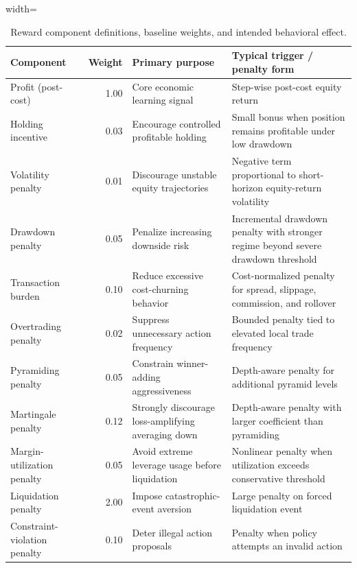 \begin{table}[!tbp]
\centering
\caption{Reward component definitions, baseline weights, and intended behavioral effect.}
\label{tab:reward_components}

\begin{adjustbox}{width=\linewidth}
\begin{tabular}{l r p{4.2cm} p{6.2cm}}
\toprule
\textbf{Component} & \textbf{Weight} & \textbf{Primary purpose} & \textbf{Typical trigger / penalty form} \\
\midrule
Profit (post-cost) & 1.00 & Core economic learning signal & Step-wise post-cost equity return \\
Holding incentive & 0.03 & Encourage controlled profitable holding & Small bonus when position remains profitable under low drawdown \\
Volatility penalty & 0.01 & Discourage unstable equity trajectories & Negative term proportional to short-horizon equity-return volatility \\
Drawdown penalty & 0.05 & Penalize increasing downside risk & Incremental drawdown penalty with stronger regime beyond severe drawdown threshold \\
Transaction burden & 0.10 & Reduce excessive cost-churning behavior & Cost-normalized penalty for spread, slippage, commission, and rollover \\
Overtrading penalty & 0.02 & Suppress unnecessary action frequency & Bounded penalty tied to elevated local trade frequency \\
Pyramiding penalty & 0.05 & Constrain winner-adding aggressiveness & Depth-aware penalty for additional pyramid levels \\
Martingale penalty & 0.12 & Strongly discourage loss-amplifying averaging down & Depth-aware penalty with larger coefficient than pyramiding \\
Margin-utilization penalty & 0.05 & Avoid extreme leverage usage before liquidation & Nonlinear penalty when utilization exceeds conservative threshold \\
Liquidation penalty & 2.00 & Impose catastrophic-event aversion & Large penalty on forced liquidation event \\
Constraint-violation penalty & 0.10 & Deter illegal action proposals & Penalty when policy attempts an invalid action \\
\bottomrule
\end{tabular}
\end{adjustbox}
\end{table}


